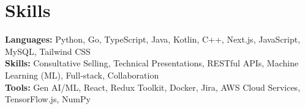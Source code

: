 \documentclass[11pt]{article}       %
\begin{document}
\vspace{-18.5pt}


\section*{Skills}
\textbf{Languages:} Python, Go, TypeScript, Java, Kotlin, C++, Next.js, JavaScript, MySQL, Tailwind CSS\\
\textbf{Skills:} Consultative Selling, Technical Presentations, RESTful APIs, Machine Learning (ML), Full-stack, Collaboration\\
\textbf{Tools:} Gen AI/ML, React, Redux Toolkit, Docker, Jira, AWS Cloud Services, TensorFlow.js, NumPy\\

\vspace{-6.5pt}
\end{document}
